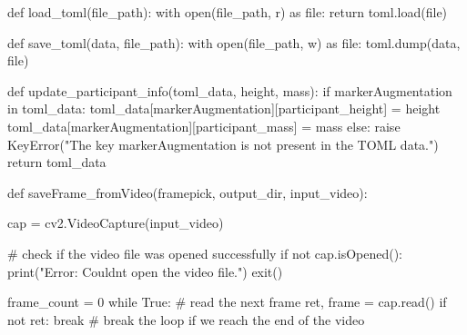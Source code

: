 \documentclass[
  letterpaper,
  DIV=11,
  numbers=noendperiod]{scrreprt}
\newenvironment{Shaded}{\begin{snugshade}}{\end{snugshade}}
\newcommand{\BuiltInTok}[1]{\textcolor[rgb]{0.00,0.23,0.31}{#1}}
\newcommand{\CommentTok}[1]{\textcolor[rgb]{0.37,0.37,0.37}{#1}}
\newcommand{\ControlFlowTok}[1]{\textcolor[rgb]{0.00,0.23,0.31}{#1}}
\newcommand{\DecValTok}[1]{\textcolor[rgb]{0.68,0.00,0.00}{#1}}
\newcommand{\ImportTok}[1]{\textcolor[rgb]{0.00,0.46,0.62}{#1}}
\newcommand{\KeywordTok}[1]{\textcolor[rgb]{0.00,0.23,0.31}{#1}}
\newcommand{\NormalTok}[1]{\textcolor[rgb]{0.00,0.23,0.31}{#1}}
\newcommand{\OperatorTok}[1]{\textcolor[rgb]{0.37,0.37,0.37}{#1}}
\newcommand{\PreprocessorTok}[1]{\textcolor[rgb]{0.68,0.00,0.00}{#1}}
\newcommand{\StringTok}[1]{\textcolor[rgb]{0.13,0.47,0.30}{#1}}
\newcommand{\VariableTok}[1]{\textcolor[rgb]{0.07,0.07,0.07}{#1}}
\begin{document}
\begin{Shaded}
\begin{Highlighting}[]
\KeywordTok{def}\NormalTok{ load\_toml(file\_path):}
    \ControlFlowTok{with} \BuiltInTok{open}\NormalTok{(file\_path, }\StringTok{\textquotesingle{}r\textquotesingle{}}\NormalTok{) }\ImportTok{as} \BuiltInTok{file}\NormalTok{:}
        \ControlFlowTok{return}\NormalTok{ toml.load(}\BuiltInTok{file}\NormalTok{)}

\KeywordTok{def}\NormalTok{ save\_toml(data, file\_path):}
    \ControlFlowTok{with} \BuiltInTok{open}\NormalTok{(file\_path, }\StringTok{\textquotesingle{}w\textquotesingle{}}\NormalTok{) }\ImportTok{as} \BuiltInTok{file}\NormalTok{:}
\NormalTok{        toml.dump(data, }\BuiltInTok{file}\NormalTok{)}

\KeywordTok{def}\NormalTok{ update\_participant\_info(toml\_data, height, mass):}
    \ControlFlowTok{if} \StringTok{\textquotesingle{}markerAugmentation\textquotesingle{}} \KeywordTok{in}\NormalTok{ toml\_data:}
\NormalTok{        toml\_data[}\StringTok{\textquotesingle{}markerAugmentation\textquotesingle{}}\NormalTok{][}\StringTok{\textquotesingle{}participant\_height\textquotesingle{}}\NormalTok{] }\OperatorTok{=}\NormalTok{ height}
\NormalTok{        toml\_data[}\StringTok{\textquotesingle{}markerAugmentation\textquotesingle{}}\NormalTok{][}\StringTok{\textquotesingle{}participant\_mass\textquotesingle{}}\NormalTok{] }\OperatorTok{=}\NormalTok{ mass}
    \ControlFlowTok{else}\NormalTok{:}
        \ControlFlowTok{raise} \PreprocessorTok{KeyError}\NormalTok{(}\StringTok{"The key \textquotesingle{}markerAugmentation\textquotesingle{} is not present in the TOML data."}\NormalTok{)}
    \ControlFlowTok{return}\NormalTok{ toml\_data}

\KeywordTok{def}\NormalTok{ saveFrame\_fromVideo(framepick, output\_dir, input\_video):    }

\NormalTok{    cap }\OperatorTok{=}\NormalTok{ cv2.VideoCapture(input\_video)}
            
    \CommentTok{\# check if the video file was opened successfully}
    \ControlFlowTok{if} \KeywordTok{not}\NormalTok{ cap.isOpened():}
        \BuiltInTok{print}\NormalTok{(}\StringTok{"Error: Couldn\textquotesingle{}t open the video file."}\NormalTok{)}
\NormalTok{        exit()}
    
               
\NormalTok{    frame\_count }\OperatorTok{=} \DecValTok{0}
    \ControlFlowTok{while} \VariableTok{True}\NormalTok{:}
    \CommentTok{\# read the next frame}
\NormalTok{        ret, frame }\OperatorTok{=}\NormalTok{ cap.read()}
        \ControlFlowTok{if} \KeywordTok{not}\NormalTok{ ret:}
            \ControlFlowTok{break}  \CommentTok{\# break the loop if we reach the end of the video}
            

\end{Highlighting}
\end{Shaded}
\end{document}
